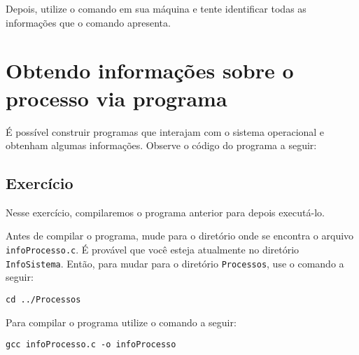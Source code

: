 Depois, utilize o comando  em sua máquina e tente identificar todas as informações que o comando apresenta.


\section{Obtendo informações sobre o processo via programa}
É possível construir programas que interajam com o sistema operacional e obtenham algumas informações. Observe o código do programa a seguir:



\subsection{Exercício}
Nesse exercício, compilaremos o programa anterior para depois executá-lo.

Antes de compilar o programa, mude para o diretório onde se encontra o arquivo \texttt{infoProcesso.c}. É provável que você esteja atualmente no diretório \texttt{InfoSistema}. Então, para mudar para o diretório \texttt{Processos},  use o comando a seguir:

\begin{lstlisting}[style=MyBashStyle]
cd ../Processos
\end{lstlisting}

Para compilar o programa utilize o comando a seguir:
\begin{lstlisting}[style=MyBashStyle]
gcc infoProcesso.c -o infoProcesso
\end{lstlisting}
